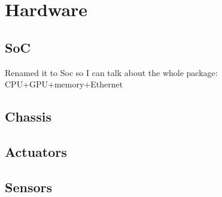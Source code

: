 \documentclass[class=article, crop=false]{standalone}
\begin{document}
\section{Hardware}\label{sec:hardware}

\subsection{SoC}\label{subsec:soc}
Renamed it to Soc so I can talk about the whole package: \\
CPU+GPU+memory+Ethernet

\subsection{Chassis}\label{subsec:chassis}

\subsection{Actuators}\label{subsec:actuators}

\subsection{Sensors}\label{subsec:sensors}
\end{document}
